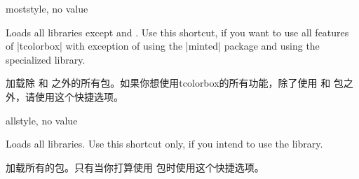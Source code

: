 




\begin{docTcbKey}[library]{most}{}{style, no value}

Loads all libraries except  and .
Use this shortcut, if you want to use all features of |tcolorbox|
with exception of using the |minted| package and using
the specialized  library.

加载除  和  之外的所有包。如果你想使用tcolorbox的所有功能，除了使用  和  包之外，请使用这个快捷选项。
\end{docTcbKey}

\begin{docTcbKey}[library]{all}{}{style, no value}

Loads all libraries. Use this shortcut only, if you intend to use the
 library.

加载所有的包。只有当你打算使用  包时使用这个快捷选项。

\end{docTcbKey}